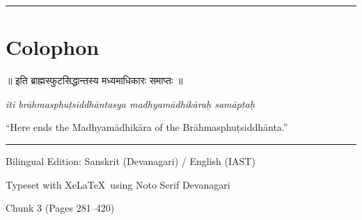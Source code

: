 \documentclass[11pt,a4paper]{article}
\providecommand{\XeLaTeX}{XeLaTeX}
\newcommand{\longline}{\noindent\rule{\textwidth}{0.4pt}}
\newcommand{\dev}[1]{{\devanagarifont #1}}
\theoremstyle{definition}
\begin{document}
\longline

\newpage
\section*{Colophon}

\begin{center}
\begin{minipage}{0.85\textwidth}
\centering
{\large\dev{॥ इति ब्राह्मस्फुटसिद्धान्तस्य मध्यमाधिकारः समाप्तः ॥}}

\vspace{0.5cm}
\textit{iti br\=ahmasphu\d{t}siddh\=antasya madhyam\=adhik\=ara\d{h} sam\=apta\d{h}}

\vspace{0.5cm}
``Here ends the Madhyam\=adhik\=ara of the Br\=ahmasphu\d{t}siddh\=anta.''

\vspace{1.5cm}
\rule{0.6\textwidth}{0.4pt}

\vspace{0.5cm}
{\small Bilingual Edition: Sanskrit (Devanagari) / English (IAST)}

\vspace{0.3cm}
{\small Typeset with \XeLaTeX\ using Noto Serif Devanagari}

\vspace{0.3cm}
{\small Chunk 3 (Pages 281--420)}
\end{minipage}
\end{center}
\end{document}
